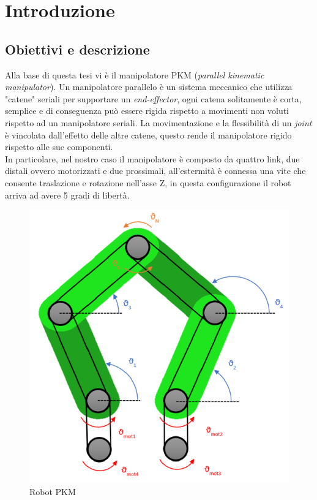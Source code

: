 \section{Introduzione}
\subsection{Obiettivi e descrizione}
Alla base di questa tesi vi è il manipolatore PKM (\textit{parallel kinematic manipulator}). Un manipolatore parallelo è un sistema meccanico che utilizza "catene" seriali per supportare un \textit{end-effector}, ogni catena solitamente è corta, semplice e di conseguenza può essere rigida rispetto a movimenti non voluti rispetto ad un manipolatore seriali. La movimentazione e la flessibilità di un \textit{joint} è vincolata dall'effetto delle altre catene, questo rende il manipolatore rigido rispetto alle sue componenti. 
\\In particolare, nel nostro caso il manipolatore è composto da quattro link, due distali ovvero motorizzati e due prossimali, all'estermità è connessa una vite che consente traslazione e rotazione nell'asse Z, in questa configurazione il robot arriva ad avere 5 gradi di libertà.
\begin{figure}[ht]
	\begin{center}
		\includegraphics[scale=0.7]{Immagini/Robot1.png}
		\caption{Robot PKM 
		\label{fig:PKM}}
	\end{center}
\end{figure}
